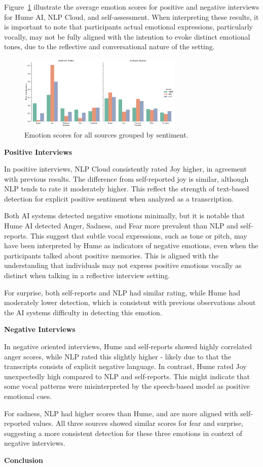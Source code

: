 Figure~\ref{fig:sentiment-bar-rq3} illustrate the average emotion scores for positive and negative interviews for Hume AI, NLP Cloud, and self-assessment. 
When interpreting these results, it is important to note that participants actual emotional expressions, particularly vocally, may not be fully aligned with the intention to evoke distinct emotional tones, due to the reflective and conversational nature of the setting.
\begin{figure}[!h]
    \centering 
    \includegraphics[width=0.7\textwidth]{png/results/rq3/rq3_sentiment_grouped_bar.pdf}
    \caption{Emotion scores for all sources grouped by sentiment.}
    \label{fig:sentiment-bar-rq3}
\end{figure}


\textbf{Positive Interviews}

In positive interviews, NLP Cloud consistently rated Joy higher, in agreement with previous results. The difference from self-reported joy is similar, although NLP tends to rate it moderately higher. 
This reflect the strength of text-based detection for explicit positive sentiment when analyzed as a transcription. 

Both AI systems detected negative emotions minimally, but it is notable that Hume AI detected Anger, Sadness, and Fear more prevalent than NLP and self-reports. 
This suggest that subtle vocal expressions, such as tone or pitch, may have been interpreted by Hume as indicators of negative emotions, even when the participants talked about positive memories. 
This is aligned with the understanding that individuals may not express positive emotions vocally as distinct when talking in a reflective interview setting. 

For surprise, both self-reports and NLP had similar rating, while Hume had moderately lower detection, which is consistent with previous observations about the AI systems difficulty in detecting this emotion. 

\medskip
\textbf{Negative Interviews}

In negative oriented interviews, Hume and self-reports showed highly correlated anger scores, while NLP rated this slightly higher - likely due to that the transcripts consists of explicit negative language. 
In contrast, Hume rated Joy unexpectedly high compared to NLP and self-reports. This might indicate that some vocal patterns were misinterpreted by the speech-based model as positive emotional cues. 

For sadness, NLP had higher scores than Hume, and are more aligned with self-reported values. All three sources showed similar scores for fear and surprise, suggesting a more consistent detection for these three emotions in context of negative interviews.

\medskip
\textbf{Conclusion}


